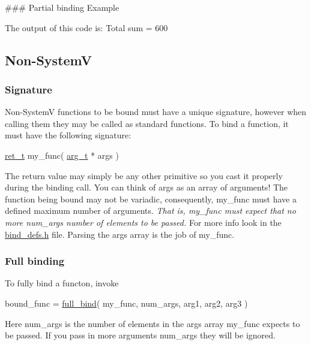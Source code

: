\#\#\# Partial binding Example 
 The output of this code is\+: {\ttfamily Total sum = 600}

\subsection*{Non-\/\+SystemV}

\subsubsection*{Signature}

Non-\/\+SystemV functions to be bound must have a unique signature, however when calling them they may be called as standard functions. To bind a function, it must have the following signature\+: 
\begin{DoxyCode}
\hyperlink{bind__defs_8h_a54aeeb54a7a6a62c72ec8dc7718fdd91}{ret\_t} my\_func( \hyperlink{bind__defs_8h_aa409ee08129c587e002cf2062a09a744}{arg\_t} * args )
\end{DoxyCode}
 The return value may simply be any other primitive so you cast it properly during the binding call. You can think of {\ttfamily args} as an array of arguments! The function being bound may not be variadic, consequently, {\ttfamily my\+\_\+func} must have a defined maximum number of \textquotesingle{}arguments\textquotesingle{}. {\itshape That is, {\ttfamily my\+\_\+func} must expect that no more {\ttfamily num\+\_\+args} number of elements to be passed.} For more info look in the {\ttfamily \hyperlink{bind__defs_8h}{bind\+\_\+defs.\+h}} file. Parsing the {\ttfamily args} array is the job of {\ttfamily my\+\_\+func}.

\subsubsection*{Full binding}

To fully bind a functon, invoke 
\begin{DoxyCode}
bound\_func = \hyperlink{bind_8c_a31fdc3dfcbd70d3f32f4e3c8a2084c6a}{full\_bind}( my\_func, num\_args, arg1, arg2, arg3 )
\end{DoxyCode}
 Here {\ttfamily num\+\_\+args} is the number of elements in the {\ttfamily args} array {\ttfamily my\+\_\+func} expects to be passed. If you pass in more arguments {\ttfamily num\+\_\+args} they will be ignored.

